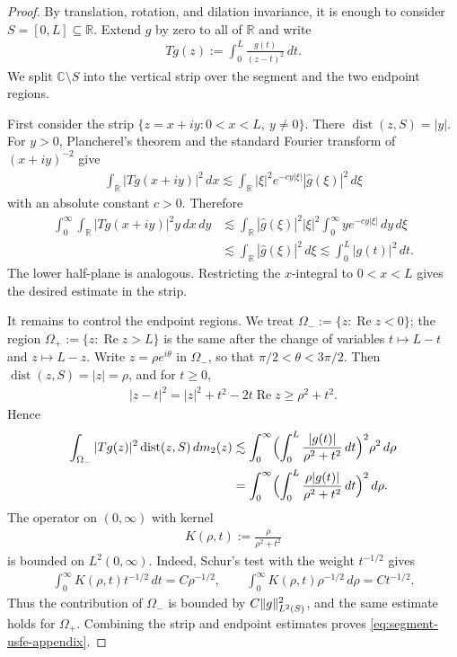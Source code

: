 \documentclass[10pt,a4paper]{amsart}
\DeclareMathOperator{\dist}{dist}
\DeclarePairedDelimiter{\norm}{\lVert}{\rVert}
\DeclarePairedDelimiter{\paren}{(}{)}
\newcommand{\CC}[0]{\mathbb{C}}
\newcommand{\RR}[0]{\mathbb{R}}
\renewcommand\Re{\operatorname{Re}}%
\renewcommand{\subset}{\subseteq}
\begin{document}
\begin{proof}
  By translation, rotation, and dilation invariance, it is enough to consider $S=[0,L]\subset\RR$.  Extend $g$ by zero to all of $\RR$ and write
  \begin{align}
    Tg(z):=\int_0^L \frac{g(t)}{(z-t)^2}\,dt .
  \end{align}
  We split $\CC\setminus S$ into the vertical strip over the segment and the two endpoint regions.

  First consider the strip $\{z=x+iy:0<x<L,\ y\ne0\}$.  There $\dist(z,S)=|y|$.  For $y>0$, Plancherel's theorem and the standard Fourier transform of $(x+iy)^{-2}$ give
  \begin{align}
    \int_{\RR}|Tg(x+iy)|^2\,dx
    \lesssim
    \int_{\RR}|\xi|^2e^{-c y|\xi|}|\widehat g(\xi)|^2\,d\xi
  \end{align}
  with an absolute constant $c>0$.  Therefore
  \begin{align}
    \int_0^\infty\int_{\RR}|Tg(x+iy)|^2y\,dx\,dy
    &\lesssim
    \int_{\RR}|\widehat g(\xi)|^2|\xi|^2
      \int_0^\infty y e^{-c y|\xi|}\,dy\,d\xi  \\
    &\lesssim \int_{\RR}|\widehat g(\xi)|^2\,d\xi
    \lesssim \int_0^L |g(t)|^2\,dt .
  \end{align}
  The lower half-plane is analogous.
  Restricting the $x$-integral to $0<x<L$ gives the desired estimate in the strip.

  It remains to control the endpoint regions.  We treat $\Omega_-:=\{z:\Re z<0\}$; the region $\Omega_+:=\{z:\Re z>L\}$ is the same after the change of variables $t\mapsto L-t$ and $z\mapsto L-z$.  Write $z=\rho e^{i\theta}$ in $\Omega_-$, so that $\pi/2<\theta<3\pi/2$.  Then $\dist(z,S)=|z|=\rho$, and for $t\ge0$,
  \begin{align}
    |z-t|^2=|z|^2+t^2-2t\Re z\ge \rho^2+t^2 .
  \end{align}
  Hence
  \begin{align}
    \int_{\Omega_-}|Tg(z)|^2\dist(z,S)\,dm_2(z)
    &\lesssim
    \int_0^\infty
      \paren[\Big]{\int_0^L\frac{|g(t)|}{\rho^2+t^2}\,dt}^2\rho^2\,d\rho \\
    &=
    \int_0^\infty
      \paren[\Big]{\int_0^L\frac{\rho |g(t)|}{\rho^2+t^2}\,dt}^2\,d\rho .
  \end{align}
  The operator on $(0,\infty)$ with kernel
  \begin{align}
    K(\rho,t):=\frac{\rho}{\rho^2+t^2}
  \end{align}
  is bounded on $L^2(0,\infty)$.  Indeed, Schur's test with the weight $t^{-1/2}$ gives
  \begin{align}
    \int_0^\infty K(\rho,t)t^{-1/2}\,dt=C\rho^{-1/2},
    \qquad
    \int_0^\infty K(\rho,t)\rho^{-1/2}\,d\rho=Ct^{-1/2}.
  \end{align}
  Thus the contribution of $\Omega_-$ is bounded by $C\norm{g}_{L^2(S)}^2$, and the same estimate holds for $\Omega_+$.  Combining the strip and endpoint estimates proves \cref{eq:segment-usfe-appendix}.
\end{proof}
\end{document}
